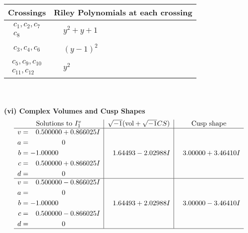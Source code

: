 \documentclass[1p]{elsarticle_modified}
\theoremstyle{definition}
\newcommand{\I}{\sqrt{-1}}
\begin{document}
\begin{tabular}{m{50pt}|m{274pt}}
Crossings & \hspace{64pt}Riley Polynomials at each crossing \\
\hline $$\begin{aligned}c_{1},c_{2},c_{7}\\c_{8}\end{aligned}$$&$\begin{aligned}
&y^2+y+1
\end{aligned}$\\
\hline $$\begin{aligned}c_{3},c_{4},c_{6}\end{aligned}$$&$\begin{aligned}
&(y-1)^2
\end{aligned}$\\
\hline $$\begin{aligned}c_{5},c_{9},c_{10}\\c_{11},c_{12}\end{aligned}$$&$\begin{aligned}
&y^2
\end{aligned}$\\
\hline
\end{tabular}\\~\\
\newpage\flushleft \textbf{(vi) Complex Volumes and Cusp Shapes}
$$\begin{array}{c|c|c}  
\text{Solutions to }I^v_{1}& \I (\text{vol} + \sqrt{-1}CS) & \text{Cusp shape}\\
 \hline 
\begin{aligned}
v &= \phantom{-}0.500000 + 0.866025 I \\
a &= \phantom{-0.000000 } 0 \\
b &= -1.00000\phantom{ +0.000000I} \\
c &= \phantom{-}0.500000 + 0.866025 I \\
d &= \phantom{-0.000000 } 0\end{aligned}
 & \phantom{-}1.64493 - 2.02988 I & \phantom{-}3.00000 + 3.46410 I \\ \hline\begin{aligned}
v &= \phantom{-}0.500000 - 0.866025 I \\
a &= \phantom{-0.000000 } 0 \\
b &= -1.00000\phantom{ +0.000000I} \\
c &= \phantom{-}0.500000 - 0.866025 I \\
d &= \phantom{-0.000000 } 0\end{aligned}
 & \phantom{-}1.64493 + 2.02988 I & \phantom{-}3.00000 - 3.46410 I\\
 \hline 
 \end{array}$$\newpage\newpage\renewcommand{\arraystretch}{1}
\end{document}
